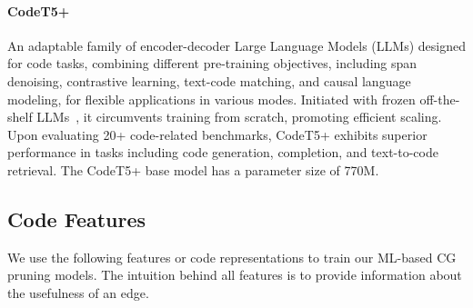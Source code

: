 \paragraph{CodeT5+~\cite{wang2023codet5+}} An adaptable family of encoder-decoder Large Language Models (LLMs) designed for code tasks, combining different pre-training objectives, including span denoising, contrastive learning, text-code matching, and causal language modeling, for flexible applications in various modes. Initiated with frozen off-the-shelf LLMs~\cite{nijkamp2022codegen}, it circumvents training from scratch, promoting efficient scaling. Upon evaluating 20+ code-related benchmarks, CodeT5+ exhibits superior performance in tasks including code generation, completion, and text-to-code retrieval. The CodeT5+ base model has a parameter size of 770M.

\subsection{Code Features}\label{ch1:sec:feat}
We use the following features or code representations to train our ML-based CG pruning models.
The intuition behind all features is to provide information about the usefulness of an edge.


